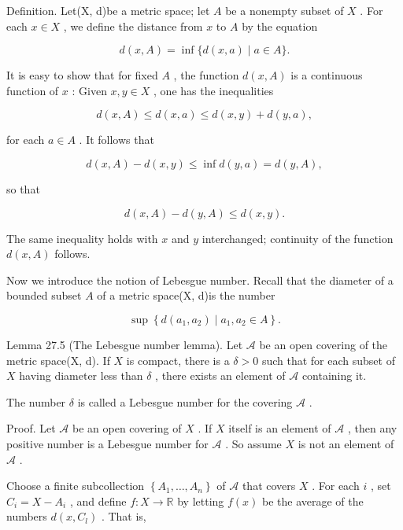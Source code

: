 Definition. Let(X, d)be a metric space; let \(A\) be a nonempty subset of \(X\) . For each \(x \in  X\) , we define the distance from \(x\) to \(A\) by the equation

\[
d\left( {x,A}\right)  = \inf \{ d\left( {x,a}\right)  \mid  a \in  A\} .
\]

It is easy to show that for fixed \(A\) , the function \(d\left( {x,A}\right)\) is a continuous function of \(x\) : Given \(x,y \in  X\) , one has the inequalities

\[
d\left( {x,A}\right)  \leq  d\left( {x,a}\right)  \leq  d\left( {x,y}\right)  + d\left( {y,a}\right) ,
\]

for each \(a \in  A\) . It follows that

\[
d\left( {x,A}\right)  - d\left( {x,y}\right)  \leq  \inf d\left( {y,a}\right)  = d\left( {y,A}\right) ,
\]

so that

\[
d\left( {x,A}\right)  - d\left( {y,A}\right)  \leq  d\left( {x,y}\right) .
\]

The same inequality holds with \(x\) and \(y\) interchanged; continuity of the function \(d\left( {x,A}\right)\) follows.

Now we introduce the notion of Lebesgue number. Recall that the diameter of a bounded subset \(A\) of a metric space(X, d)is the number

\[
\sup \left\{  {d\left( {{a}_{1},{a}_{2}}\right)  \mid  {a}_{1},{a}_{2} \in  A}\right\}  .
\]

Lemma 27.5 (The Lebesgue number lemma). Let \(\mathcal{A}\) be an open covering of the metric space(X, d). If \(X\) is compact, there is a \(\delta  > 0\) such that for each subset of \(X\) having diameter less than \(\delta\) , there exists an element of \(\mathcal{A}\) containing it.

The number \(\delta\) is called a Lebesgue number for the covering \(\mathcal{A}\) .

Proof. Let \(\mathcal{A}\) be an open covering of \(X\) . If \(X\) itself is an element of \(\mathcal{A}\) , then any positive number is a Lebesgue number for \(\mathcal{A}\) . So assume \(X\) is not an element of \(\mathcal{A}\) .

Choose a finite subcollection \(\left\{  {{A}_{1},\ldots ,{A}_{n}}\right\}\) of \(\mathcal{A}\) that covers \(X\) . For each \(i\) , set \({C}_{i} = X - {A}_{i}\) , and define \(f : X \rightarrow  \mathbb{R}\) by letting \(f\left( x\right)\) be the average of the numbers \(d\left( {x,{C}_{l}}\right)\) . That is,

